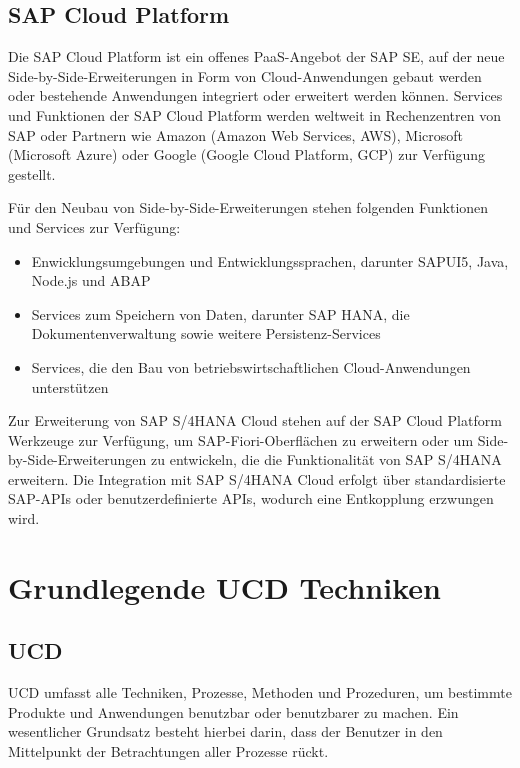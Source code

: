 \subsection{SAP Cloud Platform}
Die SAP Cloud Platform ist ein offenes \ac{PaaS}-Angebot der SAP SE, auf der neue Side-by-Side-Erweiterungen in Form von Cloud-Anwendungen gebaut werden oder bestehende Anwendungen integriert oder erweitert werden können. Services und Funktionen der SAP Cloud Platform werden weltweit in Rechenzentren von SAP oder Partnern wie Amazon (Amazon Web Services, AWS), Microsoft (Microsoft Azure) oder Google (Google Cloud Platform, GCP) zur Verfügung gestellt. 
\autocite{Elsner.2018}

Für den Neubau von Side-by-Side-Erweiterungen stehen folgenden Funktionen und Services zur Verfügung: 

\begin{itemize}
    \item Enwicklungsumgebungen und Entwicklungssprachen, darunter SAPUI5, Java, Node.js und ABAP
    
    \item Services zum Speichern von Daten, darunter SAP HANA, die Dokumentenverwaltung sowie weitere Persistenz-Services 
    
    \item Services, die den Bau von betriebswirtschaftlichen Cloud-Anwendungen unterstützen
\end{itemize}

Zur Erweiterung von SAP S/4HANA Cloud stehen auf der SAP Cloud Platform Werkzeuge zur Verfügung, um SAP-Fiori-Oberflächen zu erweitern oder um Side-by-Side-Erweiterungen zu entwickeln, die die Funktionalität von SAP S/4HANA erweitern. Die Integration mit SAP S/4HANA Cloud erfolgt über standardisierte SAP-\ac{API}s oder benutzerdefinierte \ac{API}s, wodurch eine Entkopplung erzwungen wird.
\autocite{Herzig.2018}
% 
% 
% 
% 
% 
% 
\section{Grundlegende \acl{UCD} Techniken}
\subsection{\acl{UCD}}

\acl{UCD} umfasst alle Techniken, Prozesse, Methoden und Prozeduren, um bestimmte Produkte und Anwendungen benutzbar oder benutzbarer zu machen. Ein wesentlicher Grundsatz besteht hierbei darin, dass der Benutzer in den Mittelpunkt der Betrachtungen aller Prozesse rückt. 
\autocite{Moser.2012}

